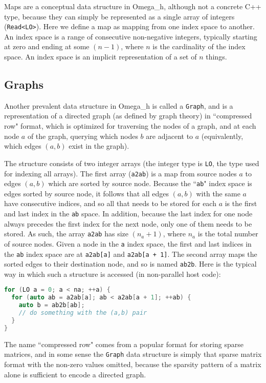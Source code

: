 \documentclass{article}
\begin{document}
Maps are a conceptual data structure in Omega\_h, although not
a concrete C++ type, because they can simply be represented
as a single array of integers (\texttt{Read<LO>}).
Here we define a map as mapping from one index space to another.
An index space is a range of consecutive non-negative integers,
typically starting at zero and ending at some $(n-1)$, where
$n$ is the cardinality of the index space.
An index space is an implicit representation of a set of $n$ things.

\subsection{Graphs}

Another prevalent data structure in Omega\_h is called a \texttt{Graph},
and is a representation of a directed graph (as defined by graph theory) in ``compressed row"
format, which is optimized for traversing the nodes of a graph, and at each node
$a$ of the graph, querying which nodes $b$ are adjacent to $a$
(equivalently, which edges $(a,b)$ exist in the graph).

The structure consists of two integer arrays (the integer type is \texttt{LO}, the
type used for indexing all arrays).
The first array (\texttt{a2ab}) is a map from source nodes $a$
to edges $(a,b)$ which are sorted by source node.
Because the ``\texttt{ab}" index space is edges sorted by source node,
it follows that all edges $(a,b)$ with the same $a$ have consecutive
indices, and so all that needs to be stored for each $a$ is the
first and last index in the \texttt{ab} space.
In addition, because the last index for one node always precedes
the first index for the next node, only one of them needs to be stored.
As such, the array \texttt{a2ab} has size $(n_a + 1)$, where $n_a$ is the
total number of source nodes.
Given a node in the \texttt{a} index space, the first and last indices
in the \texttt{ab} index space are at \texttt{a2ab[a]} and 
\texttt{a2ab[a + 1]}.
The second array maps the sorted edges to their destination node, and
so is named \texttt{ab2b}.
Here is the typical way in which such a structure is accessed
(in non-parallel host code):

\begin{lstlisting}[language=c++]
for (LO a = 0; a < na; ++a) {
  for (auto ab = a2ab[a]; ab < a2ab[a + 1]; ++ab) {
    auto b = ab2b[ab];
    // do something with the (a,b) pair
  }
}
\end{lstlisting}

The name ``compressed row" comes from a popular format for storing sparse matrices,
and in some sense the \texttt{Graph} data structure is simply that sparse matrix format
with the non-zero values omitted, because the sparsity pattern of a matrix alone is
sufficient to encode a directed graph.
\end{document}
